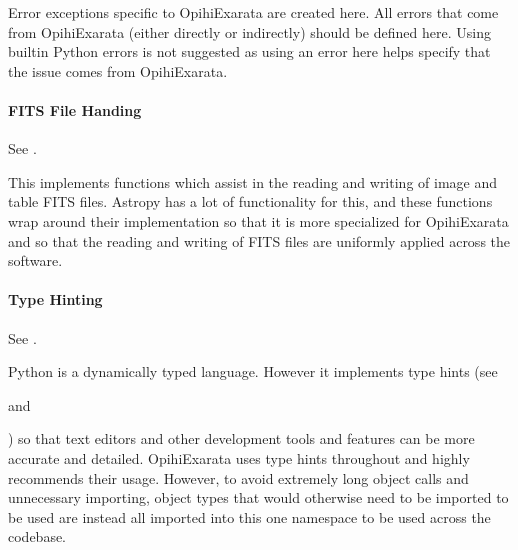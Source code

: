 \documentclass[letterpaper,11pt,english]{sphinxmanual}
\begin{document}
\sphinxAtStartPar
Error exceptions specific to OpihiExarata are created here. All errors that
come from OpihiExarata (either directly or indirectly) should be defined here.
Using built\sphinxhyphen{}in Python errors is not suggested as using an error here helps
specify that the issue comes from OpihiExarata.


\paragraph{FITS File Handing}
\label{\detokenize{technical/architecture/library:fits-file-handing}}
\sphinxAtStartPar
See {\hyperref[\detokenize{code/opihiexarata.library.fits:module-opihiexarata.library.fits}]{}}.

\sphinxAtStartPar
This implements functions which assist in the reading and writing of image and
table FITS files. Astropy has a lot of functionality for this, and these
functions wrap around their implementation so that it is more specialized for
OpihiExarata and so that the reading and writing of FITS files are uniformly
applied across the software.


\paragraph{Type Hinting}
\label{\detokenize{technical/architecture/library:type-hinting}}\label{\detokenize{technical/architecture/library:technical-architecture-library-hint}}
\sphinxAtStartPar
See {\hyperref[\detokenize{code/opihiexarata.library.hint:module-opihiexarata.library.hint}]{}}.

\sphinxAtStartPar
Python is a dynamically typed language. However it implements type hints
(see %
\begin{footnote}[53]\sphinxAtStartFootnote
{}
%
\end{footnote} and %
\begin{footnote}[54]\sphinxAtStartFootnote
{}
%
\end{footnote}) so that text editors and other development
tools and features can be more accurate and detailed. OpihiExarata uses type
hints throughout and highly recommends their usage. However, to avoid
extremely long object calls and unnecessary importing, object types that
would otherwise need to be imported to be used are instead all imported into
this one namespace to be used across the codebase.
\end{document}
